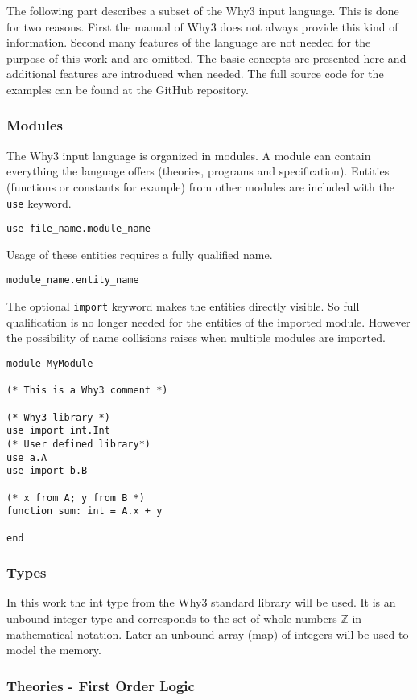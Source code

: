 The following part describes a subset of the Why3 input language. This
is done for two reasons. First the manual of Why3 \cite{why3man} does not always provide 
this kind of information. Second many features of the language are not
needed for the purpose of this work and are omitted. The basic concepts
are presented here and additional features are introduced when needed.
The full source code for the examples can be found at the GitHub repository.

\subsubsection{Modules}

The Why3 input language is organized in modules. A module can contain
everything the language offers (theories, programs and specification).
Entities (functions or constants for example) from other modules are included with the \verb"use" keyword. 
\begin{lstlisting}
use file_name.module_name
\end{lstlisting}
Usage of these entities requires a fully qualified name.
\begin{lstlisting}
module_name.entity_name
\end{lstlisting}
The optional \verb"import" keyword makes the entities directly visible. So full
qualification is no longer needed for the entities of the imported module.
However the possibility of name collisions raises when multiple modules are
imported.
\begin{lstlisting}
module MyModule

(* This is a Why3 comment *)

(* Why3 library *)
use import int.Int
(* User defined library*)
use a.A
use import b.B

(* x from A; y from B *)
function sum: int = A.x + y

end
\end{lstlisting}

\subsubsection{Types}

In this work the int type from the Why3 standard library
will be used. It is an unbound integer type and corresponds to the set of 
whole numbers $\mathbb{Z}$ in mathematical notation. Later an unbound array (map) of 
integers will be used to model the memory.

\subsubsection{Theories - First Order Logic}

